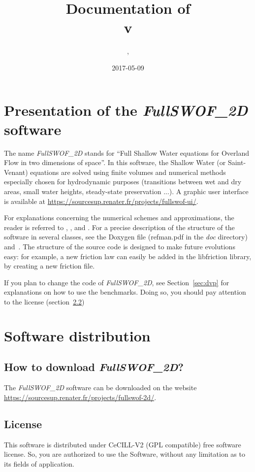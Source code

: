 \documentclass[a4paper, 11pt]{article}
\title{Documentation of \FullSWOF \\v\version}
\author{\contactFullName, \contactEmail}
\date{2017-05-09} %
\newcommand{\FullSWOF}{\emph{FullSWOF\_2D}}
\newcommand{\MainWebSite}{\url{https://sourcesup.renater.fr/projects/fullswof-2d/}}
\begin{document}
\maketitle

\thispagestyle{fancy}

\tableofcontents

\section{Presentation of the \FullSWOF{} software}

The name \FullSWOF{} stands for ``Full Shallow Water equations for Overland Flow in two 
dimensions of space''. In this software, the Shallow Water (or Saint-Venant) equations are solved 
using finite volumes and numerical methods especially chosen for hydrodynamic purposes 
(transitions between wet and dry areas, small water heights, steady-state preservation ...).
A graphic user interface is available at \url{https://sourcesup.renater.fr/projects/fullswof-ui/}.

For explanations concerning the numerical schemes 
and approximations, the reader is referred to \cite{Delestre14}, \cite{Delestre10b}, \cite{Delestre09} and \cite{DelestreJames09}.
For a precise description of the structure of the software in several classes, see the Doxygen file (refman.pdf in the \textit{doc} directory) and~\cite{Delestre08}. 
The structure  of the source code is designed to make future evolutions easy: for example, a new friction law can easily 
be added in the libfriction library, by creating a new friction file.

If you plan to change the code of \FullSWOF, 
see Section~\ref{sec:dvp} for explanations on how to use the benchmarks.
Doing so, you should pay attention to the license (section~\ref{sec:license})

\section{Software distribution}

\subsection{How to download \FullSWOF?}
The \FullSWOF{} software can be downloaded on the website \MainWebSite.

\subsection{License}\label{sec:license}
This software is distributed under CeCILL-V2 (GPL compatible) free software license. So, you are  authorized to use the Software, without any limitation as to its fields of application.
\end{document}
